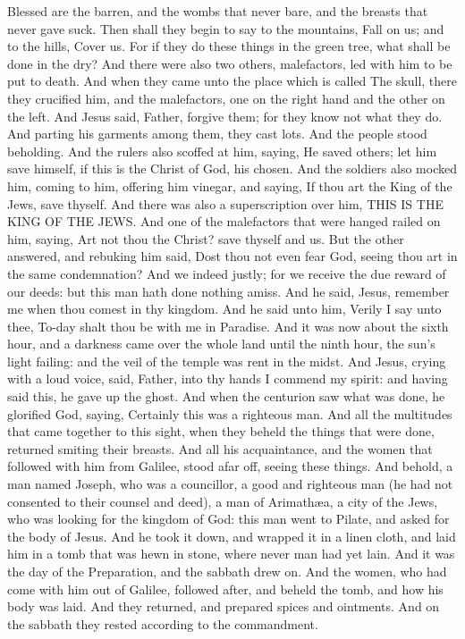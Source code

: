 Blessed are the barren, and the wombs that never bare, and the breasts that never gave suck. Then shall they begin to say to the mountains, Fall on us; and to the hills, Cover us. For if they do these things in the green tree, what shall be done in the dry?  And there were also two others, malefactors, led with him to be put to death.  And when they came unto the place which is called The skull, there they crucified him, and the malefactors, one on the right hand and the other on the left. And Jesus said, Father, forgive them; for they know not what they do. And parting his garments among them, they cast lots. And the people stood beholding. And the rulers also scoffed at him, saying, He saved others; let him save himself, if this is the Christ of God, his chosen. And the soldiers also mocked him, coming to him, offering him vinegar, and saying, If thou art the King of the Jews, save thyself. And there was also a superscription over him, THIS IS THE KING OF THE JEWS.  And one of the malefactors that were hanged railed on him, saying, Art not thou the Christ? save thyself and us. But the other answered, and rebuking him said, Dost thou not even fear God, seeing thou art in the same condemnation? And we indeed justly; for we receive the due reward of our deeds: but this man hath done nothing amiss. And he said, Jesus, remember me when thou comest in thy kingdom. And he said unto him, Verily I say unto thee, To-day shalt thou be with me in Paradise.  And it was now about the sixth hour, and a darkness came over the whole land until the ninth hour, the sun’s light failing: and the veil of the temple was rent in the midst. And Jesus, crying with a loud voice, said, Father, into thy hands I commend my spirit: and having said this, he gave up the ghost. And when the centurion saw what was done, he glorified God, saying, Certainly this was a righteous man. And all the multitudes that came together to this sight, when they beheld the things that were done, returned smiting their breasts. And all his acquaintance, and the women that followed with him from Galilee, stood afar off, seeing these things.  And behold, a man named Joseph, who was a councillor, a good and righteous man (he had not consented to their counsel and deed), a man of Arimathæa, a city of the Jews, who was looking for the kingdom of God: this man went to Pilate, and asked for the body of Jesus. And he took it down, and wrapped it in a linen cloth, and laid him in a tomb that was hewn in stone, where never man had yet lain. And it was the day of the Preparation, and the sabbath drew on. And the women, who had come with him out of Galilee, followed after, and beheld the tomb, and how his body was laid. And they returned, and prepared spices and ointments. And on the sabbath they rested according to the commandment. 

